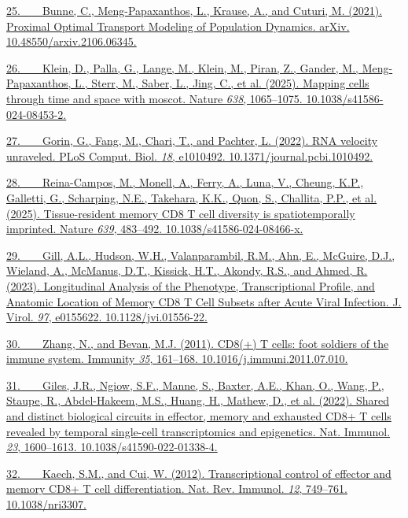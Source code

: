 \href{https://sciwheel.com/work/bibliography/15548348}{25.~  Bunne, C.,
Meng-Papaxanthos, L., Krause, A., and Cuturi, M. (2021). Proximal
Optimal Transport Modeling of Population Dynamics. arXiv.
10.48550/arxiv.2106.06345.}

\href{https://sciwheel.com/work/bibliography/17428135}{26.~  Klein, D.,
Palla, G., Lange, M., Klein, M., Piran, Z., Gander, M.,
Meng-Papaxanthos, L., Sterr, M., Saber, L., Jing, C., et al. (2025).
Mapping cells through time and space with moscot. Nature \emph{638},
1065--1075. 10.1038/s41586-024-08453-2.}

\href{https://sciwheel.com/work/bibliography/14086393}{27.~  Gorin, G.,
Fang, M., Chari, T., and Pachter, L. (2022). RNA velocity unraveled.
PLoS Comput. Biol. \emph{18}, e1010492. 10.1371/journal.pcbi.1010492.}

\href{https://sciwheel.com/work/bibliography/17425314}{28.~  Reina-Campos,
M., Monell, A., Ferry, A., Luna, V., Cheung, K.P., Galletti, G.,
Scharping, N.E., Takehara, K.K., Quon, S., Challita, P.P., et al.
(2025). Tissue-resident memory CD8 T cell diversity is spatiotemporally
imprinted. Nature \emph{639}, 483--492. 10.1038/s41586-024-08466-x.}

\href{https://sciwheel.com/work/bibliography/14778778}{29.~  Gill, A.L.,
Hudson, W.H., Valanparambil, R.M., Ahn, E., McGuire, D.J., Wieland, A.,
McManus, D.T., Kissick, H.T., Akondy, R.S., and Ahmed, R. (2023).
Longitudinal Analysis of the Phenotype, Transcriptional Profile, and
Anatomic Location of Memory CD8 T Cell Subsets after Acute Viral
Infection. J. Virol. \emph{97}, e0155622. 10.1128/jvi.01556-22.}

\href{https://sciwheel.com/work/bibliography/1124271}{30.~  Zhang, N.,
and Bevan, M.J. (2011). CD8(+) T cells: foot soldiers of the immune
system. Immunity \emph{35}, 161--168. 10.1016/j.immuni.2011.07.010.}

\href{https://sciwheel.com/work/bibliography/13830433}{31.~  Giles,
J.R., Ngiow, S.F., Manne, S., Baxter, A.E., Khan, O., Wang, P., Staupe,
R., Abdel-Hakeem, M.S., Huang, H., Mathew, D., et al. (2022). Shared and
distinct biological circuits in effector, memory and exhausted CD8+ T
cells revealed by temporal single-cell transcriptomics and epigenetics.
Nat. Immunol. \emph{23}, 1600--1613. 10.1038/s41590-022-01338-4.}

\href{https://sciwheel.com/work/bibliography/808308}{32.~  Kaech, S.M.,
and Cui, W. (2012). Transcriptional control of effector and memory CD8+
T cell differentiation. Nat. Rev. Immunol. \emph{12}, 749--761.
10.1038/nri3307.}

